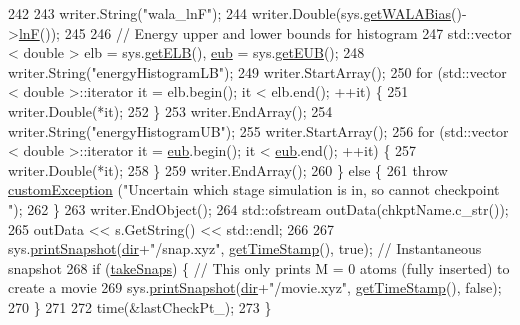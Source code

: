 \begin{DoxyCode}
242 
243         writer.String(\textcolor{stringliteral}{"wala\_lnF"});
244         writer.Double(sys.\hyperlink{classsim_system_a7cb5049de8b0988349e89e30e4000407}{getWALABias}()->\hyperlink{classwala_acb8e59580d97bc3c5b9b4ff45eb6bb9a}{lnF}());
245 
246         \textcolor{comment}{// Energy upper and lower bounds for histogram}
247         std::vector < double > elb = sys.\hyperlink{classsim_system_a610cbb1c6059151e420dbd42dd9da714}{getELB}(), \hyperlink{classcheckpoint_a7071b01d0936873321d0a706e761b6ac}{eub} = sys.\hyperlink{classsim_system_ae87e0ac03cc11259cd3b44c780a90a06}{getEUB}();
248         writer.String(\textcolor{stringliteral}{"energyHistogramLB"});
249         writer.StartArray();
250         \textcolor{keywordflow}{for} (std::vector < double >::iterator it = elb.begin(); it < elb.end(); ++it) \{
251             writer.Double(*it);
252         \}
253         writer.EndArray();
254         writer.String(\textcolor{stringliteral}{"energyHistogramUB"});
255         writer.StartArray();
256         \textcolor{keywordflow}{for} (std::vector < double >::iterator it = \hyperlink{classcheckpoint_a7071b01d0936873321d0a706e761b6ac}{eub}.begin(); it < \hyperlink{classcheckpoint_a7071b01d0936873321d0a706e761b6ac}{eub}.end(); ++it) \{
257             writer.Double(*it);
258         \}
259         writer.EndArray();
260     \} \textcolor{keywordflow}{else} \{
261         \textcolor{keywordflow}{throw} \hyperlink{classcustom_exception}{customException} (\textcolor{stringliteral}{"Uncertain which stage simulation is in, so cannot checkpoint
      "});
262     \}
263     writer.EndObject();
264     std::ofstream outData(chkptName.c\_str());
265     outData << s.GetString() << std::endl;
266 
267     sys.\hyperlink{classsim_system_ae3096dc65acdf38cc824e507cca33370}{printSnapshot}(\hyperlink{classcheckpoint_a0e0f999ee8e0b09541e9131baa8a591d}{dir}+\textcolor{stringliteral}{"/snap.xyz"}, \hyperlink{utilities_8cpp_aa6d910bf51f18a75deb20c6f0fbba285}{getTimeStamp}(), \textcolor{keyword}{true}); \textcolor{comment}{// Instantaneous
       snapshot}
268     \textcolor{keywordflow}{if} (\hyperlink{classcheckpoint_a685226e8bae8084937f73f65c326c362}{takeSnaps}) \{ \textcolor{comment}{// This only prints M = 0 atoms (fully inserted) to create a movie}
269         sys.\hyperlink{classsim_system_ae3096dc65acdf38cc824e507cca33370}{printSnapshot}(\hyperlink{classcheckpoint_a0e0f999ee8e0b09541e9131baa8a591d}{dir}+\textcolor{stringliteral}{"/movie.xyz"}, \hyperlink{utilities_8cpp_aa6d910bf51f18a75deb20c6f0fbba285}{getTimeStamp}(), \textcolor{keyword}{false});
270     \}
271 
272     time(&lastCheckPt\_);
273 \}
\end{DoxyCode}

